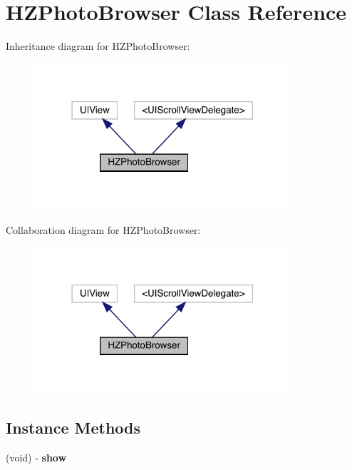 \hypertarget{interface_h_z_photo_browser}{}\section{H\+Z\+Photo\+Browser Class Reference}
\label{interface_h_z_photo_browser}


Inheritance diagram for H\+Z\+Photo\+Browser\+:\nopagebreak
\begin{figure}[H]
\begin{center}
\leavevmode
\includegraphics[width=270pt]{interface_h_z_photo_browser__inherit__graph}
\end{center}
\end{figure}


Collaboration diagram for H\+Z\+Photo\+Browser\+:\nopagebreak
\begin{figure}[H]
\begin{center}
\leavevmode
\includegraphics[width=270pt]{interface_h_z_photo_browser__coll__graph}
\end{center}
\end{figure}
\subsection*{Instance Methods}
\begin{DoxyCompactItemize}
\item 
\mbox{\label{interface_h_z_photo_browser_abcd0e543973221233cedc9d63bede2f0}} 
(void) -\/ {\bfseries show}
\end{DoxyCompactItemize}

